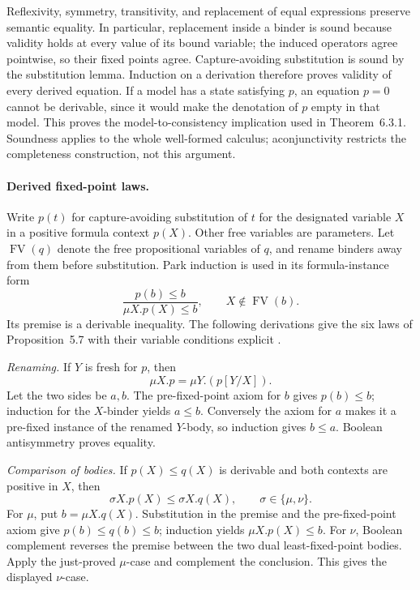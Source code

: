 Reflexivity, symmetry, transitivity, and replacement
of equal expressions preserve semantic equality.
In particular, replacement inside a binder is sound
because validity holds at every value of its bound
variable; the induced operators agree pointwise,
so their fixed points agree. Capture-avoiding
substitution is sound by the substitution lemma.
Induction on a derivation therefore proves validity
of every derived equation.
If a model has a state satisfying \(p\), an equation
\(p=0\) cannot be derivable, since it would make
the denotation of \(p\) empty in that model.
This proves the model-to-consistency implication
used in Theorem~6.3.1. Soundness applies to the
whole well-formed calculus; aconjunctivity restricts
the completeness construction, not this argument.

\paragraph{Derived fixed-point laws.}
Write \(p(t)\) for capture-avoiding substitution of \(t\)
for the designated variable \(X\) in a positive formula
context \(p(X)\). Other free variables are parameters.
Let \(\operatorname{FV}(q)\) denote the free propositional
variables of \(q\), and rename binders away from them
before substitution. Park induction is used in its
formula-instance form
\[
 \frac{p(b)\leq b}{\mu X.p(X)\leq b},
 \qquad X\notin\operatorname{FV}(b).
\]
Its premise is a derivable inequality. The following
derivations give the six laws of Proposition~5.7 with
their variable conditions explicit
\cite[prop.~5.7, pp.~341--342]{Kozen1983}.

\emph{Renaming.}
If \(Y\) is fresh for \(p\), then
\[
 \mu X.p=\mu Y.(p[Y/X]).
\]
Let the two sides be \(a,b\).
The pre-fixed-point axiom for \(b\) gives \(p(b)\leq b\);
induction for the \(X\)-binder yields \(a\leq b\).
Conversely the axiom for \(a\) makes it a pre-fixed
instance of the renamed \(Y\)-body, so induction gives
\(b\leq a\). Boolean antisymmetry proves equality.

\emph{Comparison of bodies.}
If \(p(X)\leq q(X)\) is derivable and both contexts
are positive in \(X\), then
\[
 \sigma X.p(X)\leq\sigma X.q(X),
 \qquad \sigma\in\{\mu,\nu\}.
\]
For \(\mu\), put \(b=\mu X.q(X)\).
Substitution in the premise and the pre-fixed-point
axiom give \(p(b)\leq q(b)\leq b\); induction
yields \(\mu X.p(X)\leq b\).
For \(\nu\), Boolean complement reverses the premise
between the two dual least-fixed-point bodies.
Apply the just-proved \(\mu\)-case and complement
the conclusion. This gives the displayed \(\nu\)-case.

